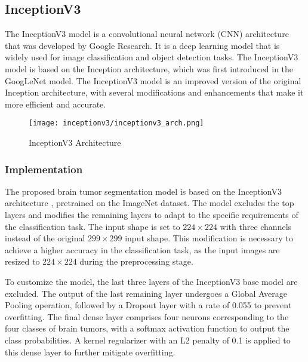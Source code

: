 \subsection{InceptionV3}\label{inceptionv3}

The InceptionV3 model is a convolutional neural network (CNN) architecture that was developed by Google Research. It is a deep learning model that is widely used for image classification and object detection tasks. The InceptionV3 model is based on the Inception architecture, which was first introduced in the GoogLeNet model. The InceptionV3 model is an improved version of the original Inception architecture, with several modifications and enhancements that make it more efficient and accurate.

\begin{figure}[H]
  \begin{center}
    \texttt{[image: inceptionv3/inceptionv3\_arch.png]}
  \end{center}
  \caption{InceptionV3 Architecture}\label{f:inceptionv3_arch}
\end{figure}


\subsubsection{Implementation}


The proposed brain tumor segmentation model is based on the InceptionV3 architecture \cite{szegedy_rethinking_2015}, pretrained on the ImageNet dataset. The model excludes the top layers and modifies the remaining layers to adapt to the specific requirements of the classification task. The input shape is set to $224\times224$ with three channels instead of the original $299\times299$ input shape. This modification is necessary to achieve a higher accuracy in the classification task, as the input images are resized to $224\times224$ during the preprocessing stage.

To customize the model, the last three layers of the InceptionV3 base model are excluded. The output of the last remaining layer undergoes a Global Average Pooling operation, followed by a Dropout layer with a rate of 0.055 to prevent overfitting. The final dense layer comprises four neurons corresponding to the four classes of brain tumors, with a softmax activation function to output the class probabilities. A kernel regularizer with an L2 penalty of 0.1 is applied to this dense layer to further mitigate overfitting.

